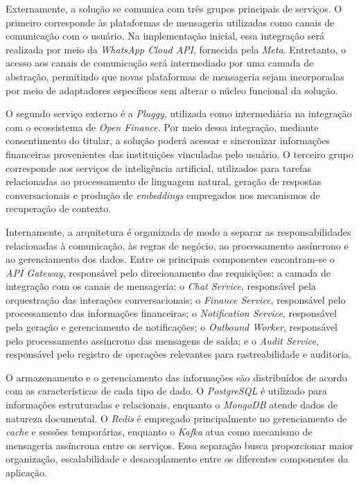 Externamente, a solução se comunica com três grupos principais de serviços. O primeiro corresponde às plataformas de mensageria utilizadas como canais de comunicação com o usuário. Na implementação inicial, essa integração será realizada por meio da \textit{WhatsApp Cloud API}, fornecida pela \textit{Meta}. Entretanto, o acesso aos canais de comunicação será intermediado por uma camada de abstração, permitindo que novas plataformas de mensageria sejam incorporadas por meio de adaptadores específicos sem alterar o núcleo funcional da solução.

O segundo serviço externo é a \textit{Pluggy}, utilizada como intermediária na integração com o ecossistema de \textit{Open Finance}. Por meio dessa integração, mediante consentimento do titular, a solução poderá acessar e sincronizar informações financeiras provenientes das instituições vinculadas pelo usuário. O terceiro grupo corresponde aos serviços de inteligência artificial, utilizados para tarefas relacionadas ao processamento de linguagem natural, geração de respostas conversacionais e produção de \textit{embeddings} empregados nos mecanismos de recuperação de contexto.

Internamente, a arquitetura é organizada de modo a separar as responsabilidades relacionadas à comunicação, às regras de negócio, ao processamento assíncrono e ao gerenciamento dos dados. Entre os principais componentes encontram-se o \textit{API Gateway}, responsável pelo direcionamento das requisições; a camada de integração com os canais de mensageria; o \textit{Chat Service}, responsável pela orquestração das interações conversacionais; o \textit{Finance Service}, responsável pelo processamento das informações financeiras; o \textit{Notification Service}, responsável pela geração e gerenciamento de notificações; o \textit{Outbound Worker}, responsável pelo processamento assíncrono das mensagens de saída; e o \textit{Audit Service}, responsável pelo registro de operações relevantes para rastreabilidade e auditoria.

O armazenamento e o gerenciamento das informações são distribuídos de acordo com as características de cada tipo de dado. O \textit{PostgreSQL} é utilizado para informações estruturadas e relacionais, enquanto o \textit{MongoDB} atende dados de natureza documental. O \textit{Redis} é empregado principalmente no gerenciamento de \textit{cache} e sessões temporárias, enquanto o \textit{Kafka} atua como mecanismo de mensageria assíncrona entre os serviços. Essa separação busca proporcionar maior organização, escalabilidade e desacoplamento entre os diferentes componentes da aplicação.

